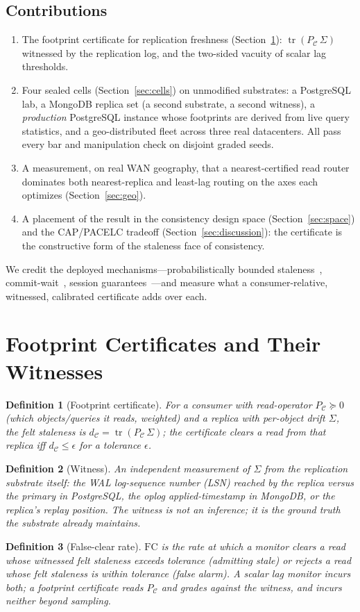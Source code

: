 \documentclass[lettersize,onecolumn]{IEEEtran}
\newtheorem{definition}{Definition}
\theoremstyle{remark}
\newcommand{\fc}{\mathrm{FC}}
\newcommand{\tr}{\operatorname{tr}}
\newcommand{\PC}{P_{\mathcal{C}}}
\begin{document}
\subsection{Contributions}
\begin{enumerate}
\item The footprint certificate for replication freshness
(Section~\ref{sec:framework}): $\tr(\PC\,\Sigma)$ witnessed by the replication
log, and the two-sided vacuity of scalar lag thresholds.
\item Four sealed cells (Section~\ref{sec:cells}) on unmodified substrates:
a PostgreSQL lab, a MongoDB replica set (a second substrate, a second witness),
a \emph{production} PostgreSQL instance whose footprints are derived from live
query statistics, and a geo-distributed fleet across three real datacenters.
All pass every bar and manipulation check on disjoint graded seeds.
\item A measurement, on real WAN geography, that a nearest-certified read router
dominates both nearest-replica and least-lag routing on the axes each optimizes
(Section~\ref{sec:geo}).
\item A placement of the result in the consistency design space
(Section~\ref{sec:space}) and the CAP/PACELC tradeoff
(Section~\ref{sec:discussion}): the certificate is the constructive form of the
staleness face of consistency.
\end{enumerate}
We credit the deployed mechanisms---probabilistically bounded
staleness~\cite{bailis2012pbs}, commit-wait~\cite{corbett2012spanner}, session
guarantees~\cite{terry1994session}---and measure what a consumer-relative,
witnessed, calibrated certificate adds over each.

\section{Footprint Certificates and Their Witnesses}\label{sec:framework}
\begin{definition}[Footprint certificate]
For a consumer with read-operator $\PC\succeq0$ (which objects/queries it reads,
weighted) and a replica with per-object drift $\Sigma$, the felt staleness is
$d_{\mathcal{C}}=\tr(\PC\,\Sigma)$; the certificate clears a read from that
replica iff $d_{\mathcal{C}}\le\epsilon$ for a tolerance $\epsilon$.
\end{definition}
\begin{definition}[Witness]
An independent measurement of $\Sigma$ from the replication substrate itself:
the WAL log-sequence number (LSN) reached by the replica versus the primary in
PostgreSQL, the oplog applied-timestamp in MongoDB, or the replica's replay
position. The witness is not an inference; it is the ground truth the substrate
already maintains.
\end{definition}
\begin{definition}[False-clear rate]
$\fc$ is the rate at which a monitor clears a read whose witnessed felt staleness
exceeds tolerance (admitting stale) or rejects a read whose felt staleness is
within tolerance (false alarm). A scalar lag monitor incurs both; a footprint
certificate reads $\PC$ and grades against the witness, and incurs neither beyond
sampling.
\end{definition}
\end{document}
